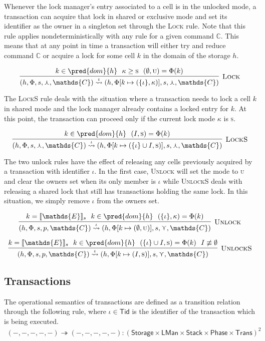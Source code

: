 Whenever the lock manager's entry associated to a cell is in the unlocked mode, a transaction can acquire that lock in shared or exclusive mode and set its identifier as the owner in a singleton set through the \textsc{Lock} rule. Note that this rule applies nondeterministically with any rule for a given command $\mathds{C}$. This means that at any point in time a transaction will either try and reduce command $\mathds{C}$ or acquire a lock for some cell $k$ in the domain of the storage $h$.

\[
\infer[\textsc{Lock}]
{
	(h, \Phi, s, \curlywedge, \mathds{C})
	\overset{\iota}{\rightsquigarrow}
	(h, \Phi[k \mapsto (\{\iota\}, \kappa)], s, \curlywedge, \mathds{C})
}
{
	k \in \pred{dom}{h}\ \
	\kappa \geq \textsc{s}\ \
	(\emptyset, \textsc{u}) = \Phi(k)
}
\]

The \textsc{LockS} rule deals with the situation where a transaction needs to lock a cell $k$ in shared mode and the lock manager already contains a locked entry for $k$. At this point, the transaction can proceed only if the current lock mode $\kappa$ is \textsc{s}.

\[
\infer[\textsc{LockS}]
{
	(h, \Phi, s, \curlywedge, \mathds{C})
	\overset{\iota}{\rightsquigarrow}
	(h, \Phi[k \mapsto (\{\iota\} \cup I, \textsc{s})], s, \curlywedge, \mathds{C})
}
{
	k \in \pred{dom}{h}\ \
	(I, \textsc{s}) = \Phi(k)
}
\]

The two unlock rules have the effect of releasing any cells previously acquired by a transaction with identifier $\iota$. In the first case, \textsc{Unlock} will set the mode to \textsc{u} and clear the owners set when its only member is $\iota$ while \textsc{UnlockS} deals with releasing a shared lock that still has transactions holding the same lock. In this situation, we simply remove $\iota$ from the owners set.

\[
\infer[\textsc{Unlock}]
{
	(h, \Phi, s, p, \mathds{C})
	\overset{\iota}{\rightsquigarrow}
	(h, \Phi[k \mapsto (\emptyset, \textsc{u})], s, \curlyvee, \mathds{C})
}
{
	k = \llbracket \mathds{E} \rrbracket_s\ \
	k \in \pred{dom}{h}\ \
	(\{\iota\}, \kappa) = \Phi(k)
}
\]

\[
\infer[\textsc{UnlockS}]
{
	(h, \Phi, s, p, \mathds{C})
	\overset{\iota}{\rightsquigarrow}
	(h, \Phi[k \mapsto (I, \textsc{s})], s, \curlyvee, \mathds{C})
}
{
	k = \llbracket \mathds{E} \rrbracket_s\ \
	k \in \pred{dom}{h}\ \
	(\{\iota\} \cup I, \textsc{s}) = \Phi(k)\ \
	I \not\equiv \emptyset
}
\]

\subsection{Transactions}
The operational semantics of transactions are defined as a transition relation through the following rule, where $\iota \in \mathsf{Tid}$ is the identifier of the transaction which is being executed.
\begin{gather*}
(-, -, -, -, -) \twoheadrightarrow (-, -, -, -, -) : (\mathsf{Storage} \times \mathsf{LMan} \times \mathsf{Stack} \times \mathsf{Phase} \times \mathsf{Trans})^2
\end{gather*}

